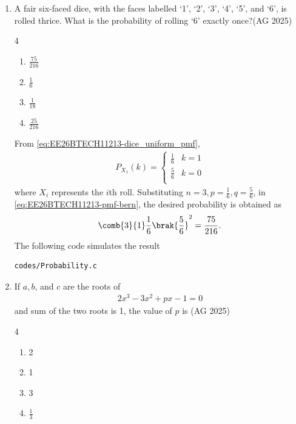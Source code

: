 \begin{enumerate}[label=\thesubsection.\arabic*,ref=\thesubsection.\theenumi]
%
 \item A fair six-faced dice, with the faces labelled ‘1’, ‘2’, ‘3’, ‘4’, ‘5’, and ‘6’, is rolled
    thrice. What is the probability of rolling ‘6’ exactly once?\hfill(AG 2025)
	\begin{multicols}{4}
 \begin{enumerate}
    \item $\frac{75}{216}$
    \item $\frac{1}{6}$
    \item $\frac{1}{18}$
    \item $\frac{25}{216}$
\end{enumerate}
\end{multicols}
\solution
From \eqref{eq:EE26BTECH11213-dice_uniform_pmf},
        \begin{align}
            P_{X_1}(k)=
                \begin{cases}
                    \frac{1}{6} &  k=1 \\
                    \frac{5}{6} & k=0\\
                \end{cases}
        \end{align}
       where $X_i$ represents the $i$th roll. 
Substituting $n=3,
p=\frac{1}{6}, 
q=\frac{5}{6}$,
in \eqref{eq:EE26BTECH11213-pmf-bern},
the desired probability is obtained as
    \begin{align}
	    \comb{3}{1}\frac{1}{6}\brak{\frac{5}{6}}^2
        =\frac{75}{216}.
    \end{align}
The following code simulates the result 
\begin{lstlisting}
codes/Probability.c
\end{lstlisting}
%
	\item If $a, b$, and $c$ are the roots of 
    \begin{align}
		2x^3 - 3x^2 + px - 1=0
       \label{eq:absum-root}
	\end{align}
		and sum of the two roots is 1, the value of $p$ is \hfill(AG 2025)
	\begin{multicols}{4}
\begin{enumerate}
    \item 2
    \item 1
    \item 3
    \item $\frac{1}{3}$
\end{enumerate}
\end{multicols}

\end{enumerate}
